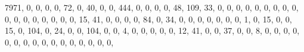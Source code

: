 \documentclass[
]{book}
\newenvironment{Shaded}{\begin{snugshade}}{\end{snugshade}}
\newcommand{\DecValTok}[1]{\textcolor[rgb]{0.00,0.00,0.81}{#1}}
\newcommand{\NormalTok}[1]{#1}
\begin{document}
\begin{Shaded}
\begin{Highlighting}[]
                          \DecValTok{7971}\NormalTok{, }\DecValTok{0}\NormalTok{, }\DecValTok{0}\NormalTok{, }\DecValTok{0}\NormalTok{, }\DecValTok{0}\NormalTok{, }\DecValTok{72}\NormalTok{, }\DecValTok{0}\NormalTok{, }\DecValTok{40}\NormalTok{, }\DecValTok{0}\NormalTok{, }\DecValTok{0}\NormalTok{, }\DecValTok{444}\NormalTok{, }\DecValTok{0}\NormalTok{, }\DecValTok{0}\NormalTok{, }\DecValTok{0}\NormalTok{, }\DecValTok{0}\NormalTok{, }\DecValTok{48}\NormalTok{, }\DecValTok{109}\NormalTok{, }\DecValTok{33}\NormalTok{, }\DecValTok{0}\NormalTok{, }\DecValTok{0}\NormalTok{, }\DecValTok{0}\NormalTok{, }\DecValTok{0}\NormalTok{,}
                          \DecValTok{0}\NormalTok{, }\DecValTok{0}\NormalTok{, }\DecValTok{0}\NormalTok{, }\DecValTok{0}\NormalTok{, }\DecValTok{0}\NormalTok{, }\DecValTok{0}\NormalTok{, }\DecValTok{0}\NormalTok{, }\DecValTok{0}\NormalTok{, }\DecValTok{0}\NormalTok{, }\DecValTok{0}\NormalTok{, }\DecValTok{0}\NormalTok{, }\DecValTok{0}\NormalTok{, }\DecValTok{0}\NormalTok{, }\DecValTok{15}\NormalTok{, }\DecValTok{41}\NormalTok{, }\DecValTok{0}\NormalTok{, }\DecValTok{0}\NormalTok{, }\DecValTok{0}\NormalTok{, }\DecValTok{0}\NormalTok{, }\DecValTok{84}\NormalTok{, }\DecValTok{0}\NormalTok{, }\DecValTok{34}\NormalTok{, }\DecValTok{0}\NormalTok{, }\DecValTok{0}\NormalTok{, }\DecValTok{0}\NormalTok{,}
                          \DecValTok{0}\NormalTok{, }\DecValTok{0}\NormalTok{, }\DecValTok{0}\NormalTok{, }\DecValTok{0}\NormalTok{, }\DecValTok{1}\NormalTok{, }\DecValTok{0}\NormalTok{, }\DecValTok{15}\NormalTok{, }\DecValTok{0}\NormalTok{, }\DecValTok{0}\NormalTok{, }\DecValTok{15}\NormalTok{, }\DecValTok{0}\NormalTok{, }\DecValTok{104}\NormalTok{, }\DecValTok{0}\NormalTok{, }\DecValTok{24}\NormalTok{, }\DecValTok{0}\NormalTok{, }\DecValTok{0}\NormalTok{, }\DecValTok{104}\NormalTok{, }\DecValTok{0}\NormalTok{, }\DecValTok{0}\NormalTok{, }\DecValTok{4}\NormalTok{, }\DecValTok{0}\NormalTok{, }\DecValTok{0}\NormalTok{, }\DecValTok{0}\NormalTok{, }\DecValTok{0}\NormalTok{,}
                          \DecValTok{0}\NormalTok{, }\DecValTok{12}\NormalTok{, }\DecValTok{41}\NormalTok{, }\DecValTok{0}\NormalTok{, }\DecValTok{0}\NormalTok{, }\DecValTok{37}\NormalTok{, }\DecValTok{0}\NormalTok{, }\DecValTok{0}\NormalTok{, }\DecValTok{8}\NormalTok{, }\DecValTok{0}\NormalTok{, }\DecValTok{0}\NormalTok{, }\DecValTok{0}\NormalTok{, }\DecValTok{0}\NormalTok{, }\DecValTok{0}\NormalTok{, }\DecValTok{0}\NormalTok{, }\DecValTok{0}\NormalTok{, }\DecValTok{0}\NormalTok{, }\DecValTok{0}\NormalTok{, }\DecValTok{0}\NormalTok{, }\DecValTok{0}\NormalTok{, }\DecValTok{0}\NormalTok{, }\DecValTok{0}\NormalTok{, }\DecValTok{0}\NormalTok{, }\DecValTok{0}\NormalTok{, }\DecValTok{0}\NormalTok{,}

\end{Highlighting}
\end{Shaded}
\end{document}

